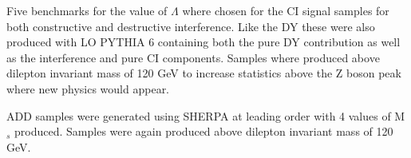 	Five benchmarks for the value of $\Lambda$ where chosen for the CI signal samples for both constructive and destructive interference. Like the DY these were also produced with LO PYTHIA 6 \cite{1126-6708-2006-05-026} containing both the pure DY contribution as well as the interference and pure CI components. Samples where produced above dilepton invariant mass of 120 GeV to increase statistics above the Z boson peak where new physics would appear. 

	ADD samples were generated using SHERPA \cite{1126-6708-2009-02-007} at leading order with 4 values of M$_{s}$ produced. Samples were again produced above dilepton invariant mass of 120 GeV. 



